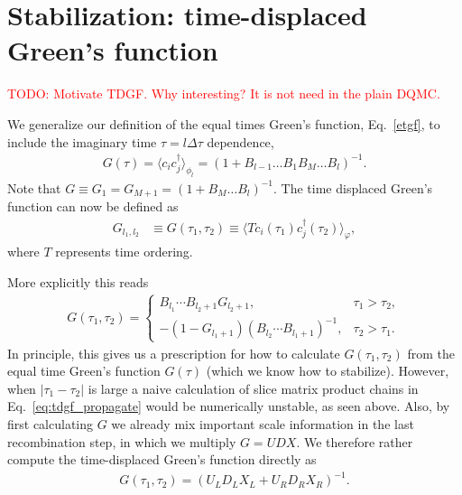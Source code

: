 \documentclass[submission, Phys]{SciPost}
\begin{document}
\section{Stabilization: time-displaced Green's function}\label{sec:TDGF}

\textcolor{red}{TODO: Motivate TDGF. Why interesting? It is not need in the plain DQMC.}

We generalize our definition of the equal times Green's function, Eq.~\ref{etgf}, to include the imaginary time $\tau = l \Delta \tau$ dependence,
\begin{align}
	G(\tau) = \langle c_{i} c_{j}^\dagger \rangle_{\phi_l} = \left( 1 + B_{l-1}\dots B_1 B_M \dots B_l \right)^{-1}.
\end{align}
Note that $ G \equiv G_1 = G_{M+1} = \left( 1 + B_M \dots B_l \right)^{-1} $. The time displaced Green's function can now be defined as \cite{Santos2003, Assaad2002a}
\begin{align*}
	G_{l_1,l_2} &\equiv G(\tau_1, \tau_2) \equiv \langle T c_i(\tau_1) c_j^\dagger(\tau_2) \rangle_\varphi,
\end{align*}
where $T$ represents time ordering.

More explicitly this reads
\begin{align}
	G(\tau_1, \tau_2) = \begin{cases}
		B_{l_1} \cdots B_{l_2 + 1} G_{l_2 + 1}, &\tau_1 > \tau_2,\\
		- \left( 1 - G_{l_1 + 1} \right) \left( B_{l_2} \cdots B_{l_1 + 1}\right)^{-1}, &\tau_2 > \tau_1.
	\end{cases} \label{eq:tdgf_propagate}
\end{align}
In principle, this gives us a prescription for how to calculate $G(\tau_1, \tau_2)$ from the equal time Green's function $G(\tau)$ (which we know how to stabilize). However, when $|\tau_1 - \tau_2|$ is large a naive calculation of slice matrix product chains in Eq.~\ref{eq:tdgf_propagate} would be numerically unstable, as seen above. Also, by first calculating $G$ we already mix important scale information in the last recombination step, in which we multiply $G = UDX$. We therefore rather compute the time-displaced Green's function directly as
\begin{align}
	G(\tau_1, \tau_2) = (U_L D_L X_L + U_R D_R X_R)^{-1}.
\end{align}
\end{document}
